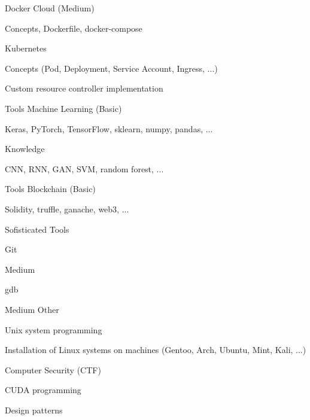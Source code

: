 \begin{cventries}
  \cventry
  {Docker}
  {Cloud (Medium)}
  {}
  {}
  {
    \begin{cvitems}
      \item {Concepts, Dockerfile, docker-compose}
    \end{cvitems}
  }

  \cventry
  {Kubernetes}
  {}
  {}
  {}
  {
    \begin{cvitems}
      \item {Concepts (Pod, Deployment, Service Account, Ingress, ...)}
      \item {Custom resource controller implementation}
    \end{cvitems}
  }

  \cventry
  {Tools}
  {Machine Learning (Basic)}
  {}
  {}
  {
    \begin{cvitems}
      \item {Keras, PyTorch, TensorFlow, sklearn, numpy, pandas, ...}
    \end{cvitems}
  }

  \cventry
  {Knowledge}
  {}
  {}
  {}
  {
    \begin{cvitems}
      \item {CNN, RNN, GAN, SVM, random forest, ...}
    \end{cvitems}
  }

  \cventry
  {Tools}
  {Blockchain (Basic)}
  {}
  {}
  {
    \begin{cvitems}
      \item {Solidity, truffle, ganache, web3, ...}
    \end{cvitems}
  }

  \cventry
  {Sofisticated}
  {Tools}
  {}
  {}
  {
    \begin{cvitems}
      \item {Git}
    \end{cvitems}
  }

  \cventry
  {Medium}
  {}
  {}
  {}
  {
    \begin{cvitems}
      \item {gdb}
    \end{cvitems}
  }

  \cventry
  {Medium}
  {Other}
  {}
  {}
  {
    \begin{cvitems}
      \item {Unix system programming}
      \item {Installation of Linux systems on machines (Gentoo, Arch, Ubuntu, Mint, Kali, ...)}
      \item {Computer Security (CTF)}
      \item {CUDA programming}
      \item {Design patterns}
    \end{cvitems}
  }


\end{cventries}
